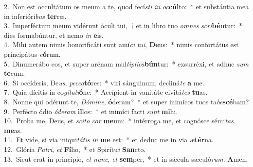 {2.~}Non est occultátum os meum a te, quod fecí\textit{sti} \textit{in} \textit{oc}\textbf{cúl}to:~* et substántia mea in inferióri\textit{bus} \textbf{ter}ræ.\\
{3.~}Imperféctum meum vidérunt óculi tui,~† et in libro tuo \textit{om}\textit{nes} \textit{scri}\textbf{bén}tur:~* dies formabúntur, et nemo \textit{in} \textbf{e}is.\\
{4.~}Mihi autem nimis honorificáti sunt amí\textit{ci} \textit{tu}\textit{i}, \textbf{De}us:~* nimis confortátus est principátus \textit{e}\textbf{ó}rum.\\
{5.~}Dinumerábo eos, et super arénam mul\textit{ti}\textit{pli}\textit{ca}\textbf{bún}tur:~* exsurréxi, et adhuc \textit{sum} \textbf{te}cum.\\
{6.~}Si occíderis, De\textit{us}, \textit{pec}\textit{ca}\textbf{tó}res:~* viri sánguinum, decliná\textit{te} \textbf{a} me.\\
{7.~}Quia dícitis in co\textit{gi}\textit{ta}\textit{ti}\textbf{ó}ne:~* Accípient in vanitáte civitá\textit{tes} \textbf{tu}as.\\
{8.~}Nonne qui odérunt te, \textit{Dó}\textit{mi}\textit{ne}, \textbf{ó}deram?~* et super inimícos tuos ta\textit{be}\textbf{scé}bam?\\
{9.~}Perfécto ódio \textit{ó}\textit{de}\textit{ram} \textbf{il}los:~* et inimíci facti \textit{sunt} \textbf{mi}hi.\\
{10.~}Proba me, Deus, et \textit{sci}\textit{to} \textit{cor} \textbf{me}um:~* intérroga me, et cognósce sémi\textit{tas} \textbf{me}as.\\
{11.~}Et vide, si via iniqui\textit{tá}\textit{tis} \textit{in} \textbf{me} est:~* et deduc me in via \textit{æ}\textbf{tér}na.\\
{12.~}Glória \textit{Pa}\textit{tri}, \textit{et} \textbf{Fí}lio,~* et Spirítu\textit{i} \textbf{San}cto.\\
{13.~}Sicut erat in princípio, \textit{et} \textit{nunc}, \textit{et} \textbf{sem}per,~* et in sǽcula sæculó\textit{rum}. \textbf{A}men.\\
